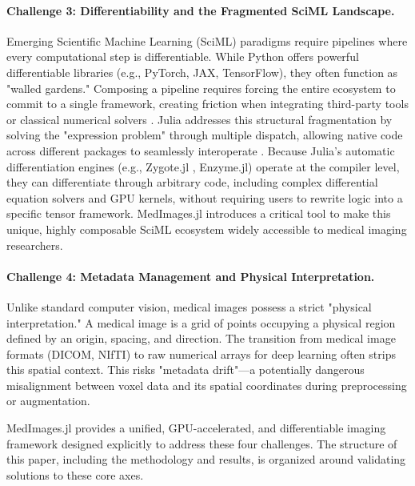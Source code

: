 \documentclass[10pt,letterpaper]{article}
\begin{document}
\paragraph{Challenge 3: Differentiability and the Fragmented SciML Landscape.}
Emerging Scientific Machine Learning (SciML) paradigms require pipelines where every computational step is differentiable. While Python offers powerful differentiable libraries (e.g., PyTorch, JAX, TensorFlow), they often function as "walled gardens." Composing a pipeline requires forcing the entire ecosystem to commit to a single framework, creating friction when integrating third-party tools or classical numerical solvers \cite{PalBhattacharya2024, EschleGl2023}. Julia addresses this structural fragmentation by solving the "expression problem" through multiple dispatch, allowing native code across different packages to seamlessly interoperate \cite{RoeschGreener2023}. Because Julia's automatic differentiation engines (e.g., Zygote.jl \cite{Fischer_2019}, Enzyme.jl) operate at the compiler level, they can differentiate through arbitrary code, including complex differential equation solvers and GPU kernels, without requiring users to rewrite logic into a specific tensor framework. MedImages.jl introduces a critical tool to make this unique, highly composable SciML ecosystem widely accessible to medical imaging researchers.

\paragraph{Challenge 4: Metadata Management and Physical Interpretation.}
Unlike standard computer vision, medical images possess a strict "physical interpretation." A medical image is a grid of points occupying a physical region defined by an origin, spacing, and direction. The transition from medical image formats (DICOM, NIfTI) to raw numerical arrays for deep learning often strips this spatial context. This risks "metadata drift"—a potentially dangerous misalignment between voxel data and its spatial coordinates during preprocessing or augmentation.

MedImages.jl provides a unified, GPU-accelerated, and differentiable imaging framework designed explicitly to address these four challenges. The structure of this paper, including the methodology and results, is organized around validating solutions to these core axes.
\end{document}

